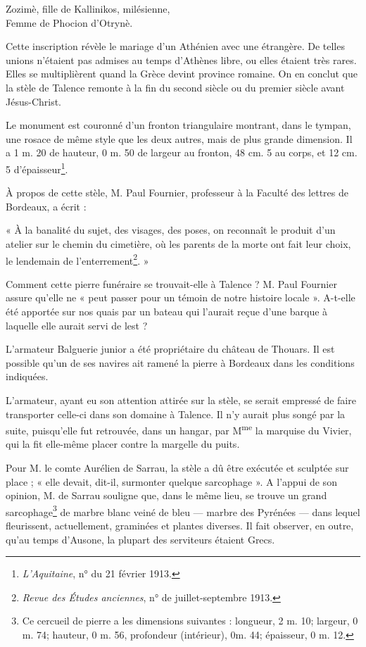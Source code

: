 \documentclass[a4paper,11pt]{book}
\begin{document}
\begin{small}
\noindent
Zozimè, fille de Kallinikos, milésienne,\\
Femme de Phocion d'Otrynè.
\end{small}

\leftskip=0cm

Cette inscription révèle le mariage d'un Athénien avec une étrangère. De telles unions n'étaient pas admises au temps d'Athènes libre, ou elles étaient très rares. Elles se multiplièrent quand la Grèce devint province romaine. On en conclut que la stèle de Talence remonte à la fin du second siècle ou du premier siècle avant Jésus-Christ.

Le monument est couronné d'un fronton triangulaire montrant, dans le tympan, une rosace de même style que les deux autres, mais de plus grande dimension. Il a 1 m. 20 de hauteur, 0 m. 50 de largeur au fronton, 48 cm. 5 au corps, et 12 cm. 5 d'épaisseur\footnote{\textit{L'Aquitaine}, n° du 21 février 1913.}.

À propos de cette stèle, M. Paul Fournier, professeur à la Faculté des lettres de Bordeaux, a écrit :

« À la banalité du sujet, des visages, des poses, on reconnaît le produit d'un atelier sur le chemin du cimetière, où les parents de la morte ont fait leur choix, le lendemain de l'enterrement\footnote{\textit{Revue des Études anciennes}, n° de juillet-septembre 1913.}. »

Comment cette pierre funéraire se trouvait-elle à Talence ? M. Paul Fournier assure qu'elle ne « peut passer pour un témoin de notre histoire locale ». A-t-elle été apportée sur nos quais par un bateau qui l'aurait reçue d'une barque à laquelle elle aurait servi de lest ?

L'armateur Balguerie junior a été propriétaire du château de Thouars. Il est possible qu'un de ses navires ait ramené la pierre à Bordeaux dans les conditions indiquées.

L'armateur, ayant eu son attention attirée sur la stèle, se serait empressé de faire transporter celle-ci dans son domaine à Talence. Il n'y aurait plus songé par la suite, puisqu'elle fut retrouvée, dans un hangar, par M\textsuperscript{me} la marquise du Vivier, qui la fit elle-même placer contre la margelle du puits.


Pour M. le comte Aurélien de Sarrau, la stèle a dû être exécutée et sculptée sur place ; « elle devait, dit-il, surmonter quelque sarcophage ». A l'appui de son opinion, M. de Sarrau souligne que, dans le même lieu, se trouve un grand sarcophage\footnote{Ce cercueil de pierre a les dimensions suivantes : longueur, 2 m. 10; largeur, 0 m. 74; hauteur, 0 m. 56, profondeur (intérieur), 0m. 44; épaisseur, 0 m. 12.} de marbre blanc veiné de bleu — marbre des Pyrénées — dans lequel fleurissent, actuellement, graminées et plantes diverses. Il fait observer, en outre, qu'au temps d'Ausone, la plupart des serviteurs étaient Grecs.
\end{document}

